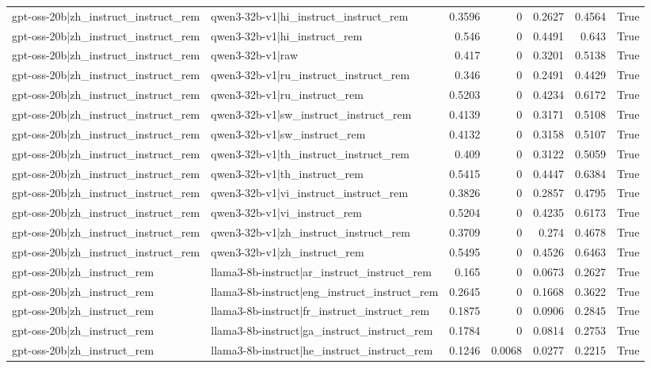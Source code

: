 \begin{table}
\begin{tabular}{l l r r r r l}
gpt-oss-20b|zh_instruct_instruct_rem & qwen3-32b-v1|hi_instruct_instruct_rem & 0.3596 & 0 & 0.2627 & 0.4564 & True \\
gpt-oss-20b|zh_instruct_instruct_rem & qwen3-32b-v1|hi_instruct_rem & 0.546 & 0 & 0.4491 & 0.643 & True \\
gpt-oss-20b|zh_instruct_instruct_rem & qwen3-32b-v1|raw & 0.417 & 0 & 0.3201 & 0.5138 & True \\
gpt-oss-20b|zh_instruct_instruct_rem & qwen3-32b-v1|ru_instruct_instruct_rem & 0.346 & 0 & 0.2491 & 0.4429 & True \\
gpt-oss-20b|zh_instruct_instruct_rem & qwen3-32b-v1|ru_instruct_rem & 0.5203 & 0 & 0.4234 & 0.6172 & True \\
gpt-oss-20b|zh_instruct_instruct_rem & qwen3-32b-v1|sw_instruct_instruct_rem & 0.4139 & 0 & 0.3171 & 0.5108 & True \\
gpt-oss-20b|zh_instruct_instruct_rem & qwen3-32b-v1|sw_instruct_rem & 0.4132 & 0 & 0.3158 & 0.5107 & True \\
gpt-oss-20b|zh_instruct_instruct_rem & qwen3-32b-v1|th_instruct_instruct_rem & 0.409 & 0 & 0.3122 & 0.5059 & True \\
gpt-oss-20b|zh_instruct_instruct_rem & qwen3-32b-v1|th_instruct_rem & 0.5415 & 0 & 0.4447 & 0.6384 & True \\
gpt-oss-20b|zh_instruct_instruct_rem & qwen3-32b-v1|vi_instruct_instruct_rem & 0.3826 & 0 & 0.2857 & 0.4795 & True \\
gpt-oss-20b|zh_instruct_instruct_rem & qwen3-32b-v1|vi_instruct_rem & 0.5204 & 0 & 0.4235 & 0.6173 & True \\
gpt-oss-20b|zh_instruct_instruct_rem & qwen3-32b-v1|zh_instruct_instruct_rem & 0.3709 & 0 & 0.274 & 0.4678 & True \\
gpt-oss-20b|zh_instruct_instruct_rem & qwen3-32b-v1|zh_instruct_rem & 0.5495 & 0 & 0.4526 & 0.6463 & True \\
gpt-oss-20b|zh_instruct_rem & llama3-8b-instruct|ar_instruct_instruct_rem & 0.165 & 0 & 0.0673 & 0.2627 & True \\
gpt-oss-20b|zh_instruct_rem & llama3-8b-instruct|eng_instruct_instruct_rem & 0.2645 & 0 & 0.1668 & 0.3622 & True \\
gpt-oss-20b|zh_instruct_rem & llama3-8b-instruct|fr_instruct_instruct_rem & 0.1875 & 0 & 0.0906 & 0.2845 & True \\
gpt-oss-20b|zh_instruct_rem & llama3-8b-instruct|ga_instruct_instruct_rem & 0.1784 & 0 & 0.0814 & 0.2753 & True \\
gpt-oss-20b|zh_instruct_rem & llama3-8b-instruct|he_instruct_instruct_rem & 0.1246 & 0.0068 & 0.0277 & 0.2215 & True \\

\end{tabular}
\end{table}
